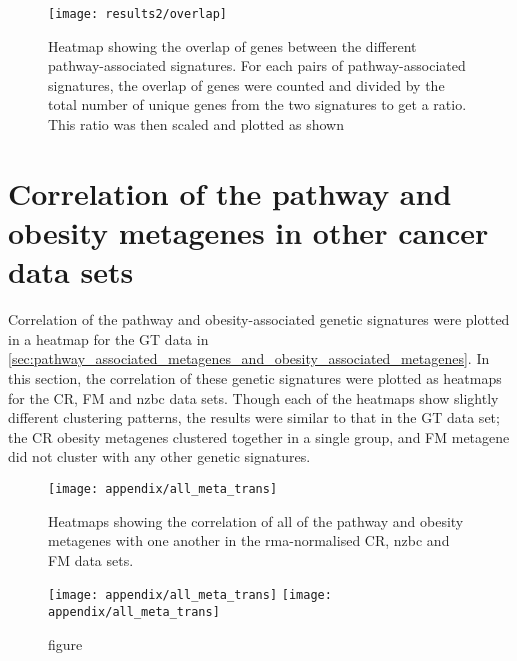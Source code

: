 	\begin{figure}[htpb]
		\centering
		\texttt{[image: results2/overlap]}
		\caption[Heatmap showing the overlap of genes between the different pathway-associated signatures]{Heatmap showing the overlap of genes between the different pathway-associated signatures. For each pairs of pathway-associated signatures, the overlap of genes were counted and divided by the total number of unique genes from the two signatures to get a ratio. This ratio was then scaled and plotted as shown}
		\label{fig:overlap_pathway_genetic_signature_extra}
	\end{figure}
	

	\section{Correlation of the pathway and obesity metagenes in other cancer data sets}
	\label{sec:correlation_of_the_pathway_and_obesity_metagenes_in_other_cancer_data_sets}

	Correlation of the pathway and obesity-associated genetic signatures were plotted in a heatmap for the GT data in \cref{sec:pathway_associated_metagenes_and_obesity_associated_metagenes}.
	In this section, the correlation of these genetic signatures were plotted as heatmaps for the CR, FM and \gls{nzbc} data sets.
	Though each of the heatmaps show slightly different clustering patterns, the results were similar to that in the GT data set; the CR obesity metagenes clustered together in a single group, and FM metagene did not cluster with any other genetic signatures.

	\begin{figure}[htp!]
		\centering
		\texttt{[image: appendix/all\_meta\_trans]}
		\caption[Heatmaps of the Pearson correlation of all the obesity and the pathway metagenes with one another in the \gls{rma}-normalised CR, \gls{nzbc} and FM data]{Heatmaps showing the correlation of all of the pathway and obesity metagenes with one another in the \gls{rma}-normalised CR, \gls{nzbc} and FM data sets.
		}
		\label{fig:appendix/all_meta_other_data}
	\end{figure}

	\begin{figure}[htpb]
		\ContinuedFloat
		\captionsetup{list=off,format=cont}
		\centering
		\texttt{[image: appendix/all\_meta\_trans]}
		\texttt{[image: appendix/all\_meta\_trans]}
		\caption[]{figure}
	\end{figure}

